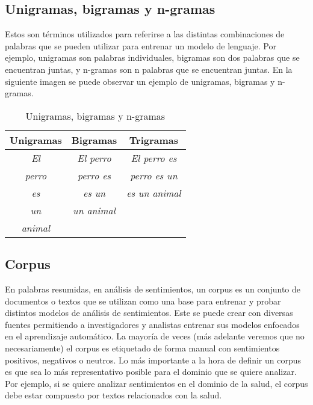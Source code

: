 \documentclass[12pt, conference]{IEEEtran}
\begin{document}
\subsection{Unigramas, bigramas y n-gramas}

Estos son términos utilizados para referirse a las distintas combinaciones de palabras que se pueden utilizar para entrenar un modelo de lenguaje. Por ejemplo, unigramas son palabras individuales, bigramas son dos palabras que se encuentran juntas, y n-gramas son n palabras que se encuentran juntas. En la siguiente imagen se puede observar un ejemplo de unigramas, bigramas y n-gramas.

\begin{table}[h]
\centering
\begin{tabular}{|c|c|c|}
\hline
\textbf{Unigramas} & \textbf{Bigramas} & \textbf{Trigramas} \\ \hline
\textit{El} & \textit{El perro} & \textit{El perro es} \\ \hline
\textit{perro} & \textit{perro es} & \textit{perro es un} \\ \hline
\textit{es} & \textit{es un} & \textit{es un animal} \\ \hline
\textit{un} & \textit{un animal} & \textit{} \\ \hline
\textit{animal} & \textit{} & \textit{} \\ \hline
\end{tabular}
\caption{Unigramas, bigramas y n-gramas}
\label{tab:my_label}
\end{table}

\subsection{Corpus}

En palabras resumidas, en análisis de sentimientos, un corpus es un conjunto de documentos o textos que se utilizan como una base para entrenar y probar distintos modelos de análisis de sentimientos. Este se puede crear con diversas fuentes permitiendo a investigadores y analistas entrenar sus modelos enfocados en el aprendizaje automático. La mayoría de veces (más adelante veremos que no necesariamente) el corpus es etiquetado de forma manual con sentimientos positivos, negativos o neutros. Lo más importante a la hora de definir un corpus es que sea lo más representativo posible para el dominio que se quiere analizar. Por ejemplo, si se quiere analizar sentimientos en el dominio de la salud, el corpus debe estar compuesto por textos relacionados con la salud.
\end{document}
